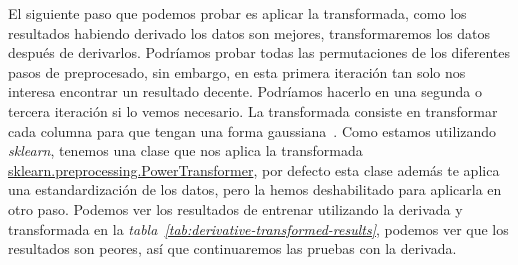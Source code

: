 El siguiente paso que podemos probar es aplicar la transformada, como los resultados habiendo derivado los datos son mejores, transformaremos los datos después de derivarlos. Podríamos probar todas las permutaciones de los diferentes pasos de preprocesado, sin embargo, en esta primera iteración tan solo nos interesa encontrar un resultado decente. Podríamos hacerlo en una segunda o tercera iteración si lo vemos necesario. La transformada consiste en transformar cada columna para que tengan una forma gaussiana\ \cite{sklearnp39:online}. Como estamos utilizando \textit{sklearn}, tenemos una clase que nos aplica la transformada \href{https://scikit-learn.org/stable/modules/generated/sklearn.preprocessing.PowerTransformer.html}{sklearn.preprocessing.PowerTransformer}, por defecto esta clase además te aplica una estandardización de los datos, pero la hemos deshabilitado para aplicarla en otro paso. Podemos ver los resultados de entrenar utilizando la derivada y transformada en la \textit{tabla\ \ref{tab:derivative-transformed-results}}, podemos ver que los resultados son peores, así que continuaremos las pruebas con la derivada.

